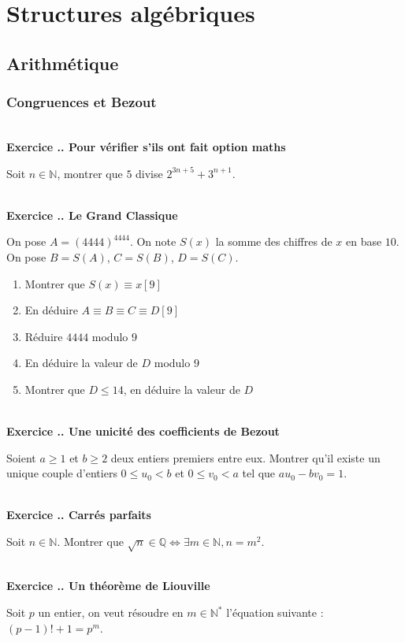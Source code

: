 \documentclass{article}
\newcommand{\mb}[1]{\mathbb{#1}}
\newcounter{exo}
\newcommand{\exercice}[1][\null]{\textbf{\\ Exercice \thesection.\theexo. #1} \addtocounter{exo}{1}}
\begin{document}
\section{Structures algébriques}

\subsection{Arithmétique}

\subsubsection{Congruences et Bezout}

\exercice[Pour vérifier s'ils ont fait option maths]

Soit $n \in \mb{N}$, montrer que $5$ divise $2^{3n+5} + 3^{n+1}$.

\exercice[Le Grand Classique]

On pose $A = (4444)^{4444}$. On note $S(x)$ la somme des chiffres 
de $x$ en base $10$. On pose $B = S(A)$, $C = S(B)$, $D = S(C)$.

\begin{enumerate}
    \item Montrer que $S(x) \equiv x [9]$
    \item En déduire $A \equiv B \equiv C \equiv D [9]$
    \item Réduire $4444$ modulo $9$
    \item En déduire la valeur de $D$ modulo $9$
    \item Montrer que $D \leq 14$, en déduire la valeur de $D$
\end{enumerate}


\exercice[Une unicité des coefficients de Bezout]

 Soient $a \ge 1$ et $ b \ge 2$ deux entiers premiers entre eux. Montrer qu'il existe un unique couple d'entiers $0 \le u_0 < b$ et $0 \le v_0 < a$ tel que $au_0 - b v_0 = 1$.
 
\exercice[Carrés parfaits]

Soit $n \in \mb{N}$. Montrer que $\sqrt{n} \in \mb{Q} \iff \exists m \in \mb{N}, n = m^2$.




\exercice[Un théorème de Liouville]

Soit $p$ un entier, on veut résoudre en $m \in \mb{N}^*$ l'équation suivante : $(p-1)! +1 = p^m$.
\end{document}
